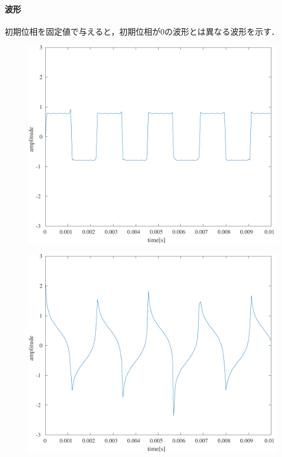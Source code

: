 \paragraph{波形}初期位相を固定値で与えると，初期位相が\(0\)の波形とは異なる波形を示す．
\begin{figure}[H]
    \centering
    \begin{minipage}[b]{.24\textwidth}
        \centering
        \includegraphics[keepaspectratio,width=\textwidth]{../../Figures/03_11_kukei.pdf}
        \label{fig:実験結果矩形波_pure}
    \end{minipage}
    \begin{minipage}[b]{.24\textwidth}
        \centering
        \includegraphics[keepaspectratio,width=\textwidth]{../../Figures/03_12.pdf}

\end{minipage}
\end{figure}
